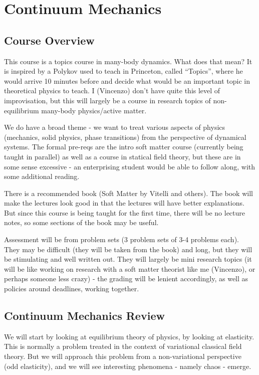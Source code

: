 \section{Continuum Mechanics}

\subsection{Course Overview}
This course is a topics course in many-body dynamics. What does that mean? It is inspired by a Polykov used to teach in Princeton, called ``Topics'', where he would arrive 10 minutes before and decide what would be an important topic in theoretical physics to teach. I (Vincenzo) don't have quite this level of improvisation, but this will largely be a course in research topics of non-equilibrium many-body physics/active matter.

We do have a broad theme - we want to treat various aspects of physics (mechanics, solid physics, phase transitions) from the perspective of dynamical systems. The formal pre-reqs are the intro soft matter course (currently being taught in parallel) as well as a course in statical field theory, but these are in some sense excessive - an enterprising student would be able to follow along, with some additional reading.

There is a recommended book (Soft Matter by Vitelli and others). The book will make the lectures look good in that the lectures will have better explanations. But since this course is being taught for the first time, there will be no lecture notes, so some sections of the book may be useful.

Assessment will be from problem sets (3 problem sets of 3-4 problems each). They may be difficult (they will be taken from the book) and long, but they will be stimulating and well written out. They will largely be mini research topics (it will be like working on research with a soft matter theorist like me (Vincenzo), or perhaps someone less crazy) - the grading will be lenient accordingly, as well as policies around deadlines, working together.

\subsection{Continuum Mechanics Review}

We will start by looking at equilibrium theory of physics, by looking at elasticity. This is normally a problem treated in the context of variational classical field theory. But we will approach this problem from a non-variational perspective (odd elasticity), and we will see interesting phenomena - namely chaos - emerge.

